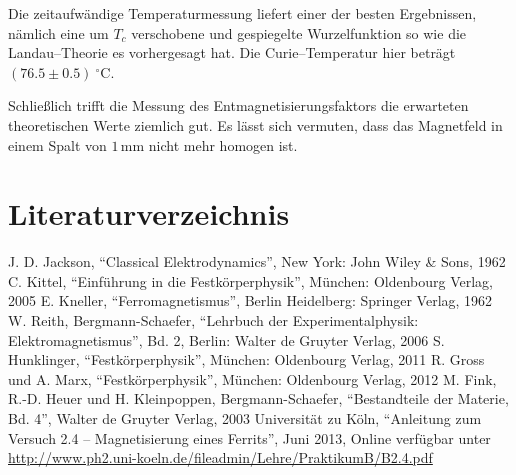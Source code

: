 \documentclass[12pt,a4paper]{scrartcl}
\numberwithin{equation}{section} %
\begin{document}
Die zeitaufwändige Temperaturmessung liefert einer der besten Ergebnissen, nämlich eine um $T_{c}$ verschobene und gespiegelte Wurzelfunktion so wie die Landau--Theorie es vorhergesagt hat. Die Curie--Temperatur hier beträgt $(76.5 \pm 0.5) \ ^\circ\mathrm C$.

Schließlich trifft die Messung des Entmagnetisierungsfaktors die erwarteten theoretischen Werte ziemlich gut. Es lässt sich vermuten, dass das Magnetfeld in einem Spalt von $1\mathrm{\,mm}$ nicht mehr homogen ist.

\clearpage
\hypertarget{literaturverzeichnis}{%
\section{Literaturverzeichnis}\label{literaturverzeichnis}}
\renewcommand{\section}[2]{} %
\begin{thebibliography}{9}
	J. D. Jackson, ``Classical Elektrodynamics'', New York: John Wiley \& Sons, 1962
		C. Kittel, ``Einführung in die Festkörperphysik'', München: Oldenbourg Verlag, 2005
		E. Kneller, ``Ferromagnetismus'', Berlin Heidelberg: Springer Verlag, 1962
		W. Reith, Bergmann-Schaefer, ``Lehrbuch der Experimentalphysik: Elektromagnetismus'', Bd. 2, Berlin: Walter de Gruyter Verlag, 2006
		S. Hunklinger, ``Festkörperphysik'', München: Oldenbourg Verlag, 2011
		R. Gross und A. Marx, ``Festkörperphysik'', München: Oldenbourg Verlag, 2012
		M. Fink, R.-D. Heuer und H. Kleinpoppen, Bergmann-Schaefer, ``Bestandteile der Materie, Bd. 4'', Walter de Gruyter Verlag, 2003
		Universität zu Köln, ``Anleitung zum Versuch 2.4 -- Magnetisierung eines Ferrits'', Juni 2013, Online verfügbar unter \url{http://www.ph2.uni-koeln.de/fileadmin/Lehre/PraktikumB/B2.4.pdf}
\end{thebibliography}
\end{document}
